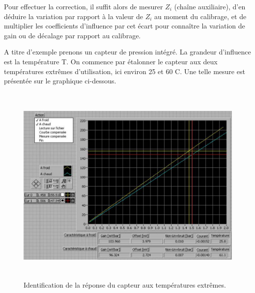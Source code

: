 \begin{center}
\end{center}

Pour effectuer la correction, il suffit alors de mesurer $Z_i$ (chaîne auxiliaire), d'en déduire la variation par rapport à la valeur de $Z_i$ au moment du calibrage, et de multiplier les coefficients d'influence par cet écart pour connaître la variation de gain ou de décalage par rapport au calibrage.

A titre d'exemple prenons un capteur de pression intégré. La grandeur d'influence est la température T. On commence par étalonner le capteur aux deux températures extrêmes d'utilisation, ici environ 25 et 60 \degre C. Une telle mesure est présentée sur le graphique ci-dessous.

\begin{figure}
\centering
\includegraphics[height=10cm]{assets/figures/3_5_identification_reponse_en_temperature.PNG}
\caption{ Identification de la réponse du capteur aux températures extrêmes.}
\label{fig:IdentificationTemperature}
\end{figure}

